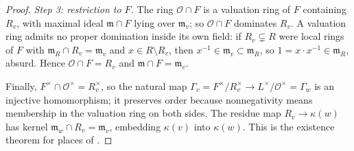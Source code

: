 \begin{proof}
\emph{Step 3: restriction to $F$.} The ring $\mathcal O\cap F$ is a
valuation ring of $F$ containing $R_v$, with maximal ideal
$\mathfrak m\cap F$ lying over $\mathfrak m_v$; so $\mathcal O\cap F$
dominates $R_v$. A valuation ring admits no proper domination inside its
own field: if $R_v\subsetneq R$ were local rings of $F$ with
$\mathfrak m_R\cap R_v=\mathfrak m_v$ and $x\in R\setminus R_v$, then
$x^{-1}\in\mathfrak m_v\subset\mathfrak m_R$, so
$1=x\cdot x^{-1}\in\mathfrak m_R$, absurd. Hence $\mathcal O\cap F=R_v$
and $\mathfrak m\cap F=\mathfrak m_v$.

Finally, $F^\times\cap\mathcal O^\times=R_v^\times$, so the natural map
$\Gamma_v=F^\times/R_v^\times\to L^\times/\mathcal O^\times=\Gamma_w$ is
an injective homomorphism; it preserves order because nonnegativity means
membership in the valuation ring on both sides. The residue map
$R_v\to\kappa(w)$ has kernel $\mathfrak m_w\cap R_v=\mathfrak m_v$,
embedding $\kappa(v)$ into $\kappa(w)$. This is the existence theorem for
places of \cite[Chapter~VI, \S4]{ZariskiSamuelII}.
\end{proof}

